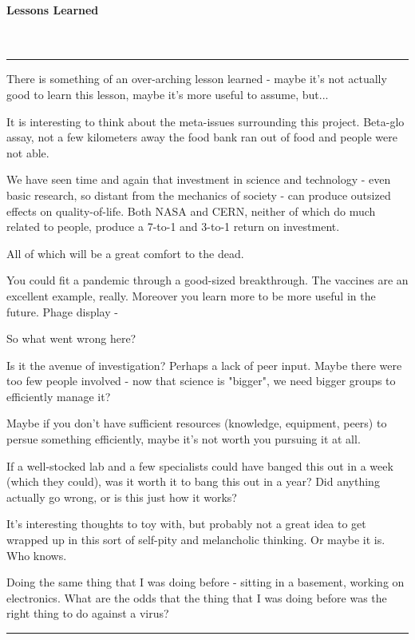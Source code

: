 \documentclass[paper.tex]{subfiles}
\begin{document}
\paragraph{Lessons Learned} \


\rule{\linewidth}{0.2pt}


There is something of an over-arching lesson learned - maybe it's not actually good to learn this lesson, maybe it's more useful to assume, but...

It is interesting to think about the meta-issues surrounding this project. Beta-glo assay, not a few kilometers away the food bank ran out of food and people were not able. 

We have seen time and again that investment in science and technology - even basic research, so distant from the mechanics of society - can produce outsized effects on quality-of-life. Both NASA and CERN, neither of which do much related to people, produce a 7-to-1 and 3-to-1 return on investment. 

All of which will be a great comfort to the dead. 

You could fit a pandemic through a good-sized breakthrough. The vaccines are an excellent example, really. Moreover you learn more to be more useful in the future. Phage display  - 

So what went wrong here? 

Is it the avenue of investigation? Perhaps a lack of peer input. Maybe there were too few people involved - now that science is "bigger", we need bigger groups to efficiently manage it? 

Maybe if you don't have sufficient resources (knowledge, equipment, peers) to persue something efficiently, maybe it's not worth you pursuing it at all.

If a well-stocked lab and a few specialists could have banged this out in a week (which they could), was it worth it to bang this out in a year? Did anything actually go wrong, or is this just how it works?

It's interesting thoughts to toy with, but probably not a great idea to get wrapped up in this sort of self-pity and melancholic thinking. Or maybe it is. Who knows.

Doing the same thing that I was doing before - sitting in a basement, working on electronics. What are the odds that the thing that I was doing before was the right thing to do against a virus?

\rule{\linewidth}{0.2pt}
\end{document}
